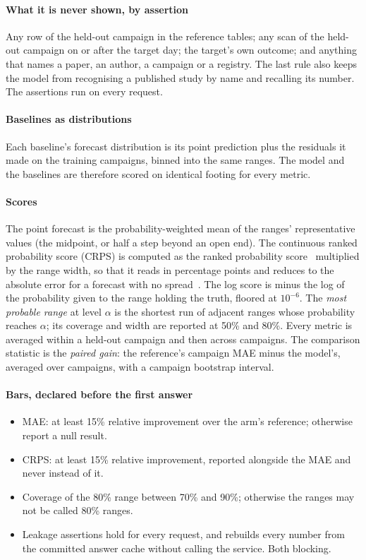 \paragraph{What it is never shown, by assertion} Any row of the held-out campaign in the reference tables; any
scan of the held-out campaign on or after the target day; the target's own outcome; and anything that names a
paper, an author, a campaign or a registry. The last rule also keeps the model from recognising a published study by
name and recalling its number. The assertions run on every request.

\paragraph{Baselines as distributions} Each baseline's forecast distribution is its point prediction plus the
residuals it made on the training campaigns, binned into the same ranges. The model and the baselines are therefore
scored on identical footing for every metric.

\paragraph{Scores} The point forecast is the probability-weighted mean of the ranges' representative values (the
midpoint, or half a step beyond an open end). The continuous ranked probability score (CRPS) is computed as the
ranked probability score~\citep{epstein1969} multiplied by the range width, so that it reads in percentage points
and reduces to the absolute error for a forecast with no spread~\citep{gneiting2007}. The log score is minus the
log of the probability given to the range holding the truth, floored at $10^{-6}$. The \emph{most probable range}
at level $\alpha$ is the shortest run of adjacent ranges whose probability reaches $\alpha$; its coverage and width
are reported at 50\% and 80\%. Every metric is averaged within a held-out campaign and then across campaigns. The
comparison statistic is the \emph{paired gain}: the reference's campaign MAE minus the model's, averaged over
campaigns, with a campaign bootstrap interval.

\paragraph{Bars, declared before the first answer}
\begin{itemize}
  \item MAE: at least 15\% relative improvement over the arm's reference; otherwise report a null result.
  \item CRPS: at least 15\% relative improvement, reported alongside the MAE and never instead of it.
  \item Coverage of the 80\% range between 70\% and 90\%; otherwise the ranges may not be called 80\% ranges.
  \item Leakage assertions hold for every request, and  rebuilds every number from the committed
        answer cache without calling the service. Both blocking.
\end{itemize}

